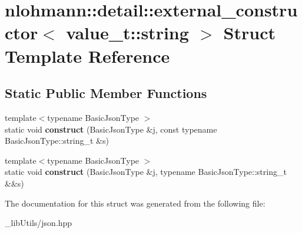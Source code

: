 \hypertarget{structnlohmann_1_1detail_1_1external__constructor_3_01value__t_1_1string_01_4}{}\section{nlohmann\+:\+:detail\+:\+:external\+\_\+constructor$<$ value\+\_\+t\+:\+:string $>$ Struct Template Reference}
\label{structnlohmann_1_1detail_1_1external__constructor_3_01value__t_1_1string_01_4}
\subsection*{Static Public Member Functions}
\begin{DoxyCompactItemize}
\item 
{\footnotesize template$<$typename Basic\+Json\+Type $>$ }\\static void {\bfseries construct} (Basic\+Json\+Type \&j, const typename Basic\+Json\+Type\+::string\+\_\+t \&s)\hypertarget{structnlohmann_1_1detail_1_1external__constructor_3_01value__t_1_1string_01_4_ad88d0b4b7ea01ea20e12cc1b82fe0d92}{}\label{structnlohmann_1_1detail_1_1external__constructor_3_01value__t_1_1string_01_4_ad88d0b4b7ea01ea20e12cc1b82fe0d92}

\item 
{\footnotesize template$<$typename Basic\+Json\+Type $>$ }\\static void {\bfseries construct} (Basic\+Json\+Type \&j, typename Basic\+Json\+Type\+::string\+\_\+t \&\&s)\hypertarget{structnlohmann_1_1detail_1_1external__constructor_3_01value__t_1_1string_01_4_a74f56b9ca1d4e8db9751353d76668322}{}\label{structnlohmann_1_1detail_1_1external__constructor_3_01value__t_1_1string_01_4_a74f56b9ca1d4e8db9751353d76668322}

\end{DoxyCompactItemize}


The documentation for this struct was generated from the following file\+:\begin{DoxyCompactItemize}
\item 
\+\_\+lib\+Utils/json.\+hpp\end{DoxyCompactItemize}

